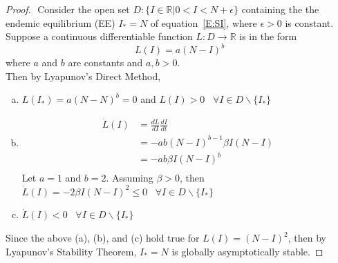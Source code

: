     \begin{proof}
      $ $\newline	
      Consider the open set $D: \{I \in \mathbb{R}| 0 < I < N+ \epsilon \}$ containing the the endemic equilibrium (EE) $I_* = N$ of equation~\eqref{E:SI}, where $\epsilon > 0$ is constant. 
      Suppose a continuous differentiable function $L:D\rightarrow \mathbb{R}$  is in the form
      \begin{equation}
      L(I) = a(N-I)^b
      \end{equation} where $a$ and $b$ are constants and $a, b > 0$.\\
      
      Then by Lyapunov's Direct Method,

      \begin{enumerate}[(a)]
      	\item $L(I_*) = a(N-N)^b = 0$ and $L(I)>0$ \, $\forall I\in D\backslash \{I_*\}$
      	\item
        \begin{align*}
            \dot{L}(I)  &= \frac{dL}{dI} \frac{dI}{dt} \\
      					&= -ab(N-I)^{b-1}\beta I(N-I)\\
      					&= -ab\beta I(N-I)^b\\
      	\end{align*}
      	Let $a = 1$ and $b = 2$. Assuming $\beta>0$, then\\
      	$\dot{L}(I) = -2\beta I(N-I)^2 \leq 0$ \, $\forall I\in D \backslash \{I_*\}$
      	\item $\dot{L}(I) < 0$ \, $\forall I\in D\backslash \{I_*\}$
      \end{enumerate}
      
  	  Since the above (a), (b), and (c) hold true for $L(I) = (N-I)^2$, then by Lyapunov's Stability Theorem, $I_* = N$ is globally asymptotically stable. 
    \end{proof}
